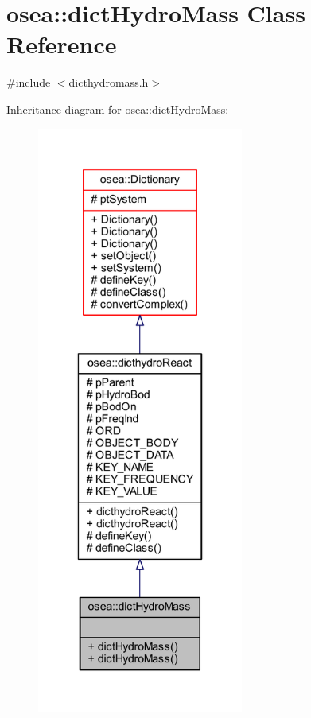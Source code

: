 \hypertarget{classosea_1_1dict_hydro_mass}{\section{osea\-:\-:dict\-Hydro\-Mass Class Reference}
\label{classosea_1_1dict_hydro_mass}
}


{\ttfamily \#include $<$dicthydromass.\-h$>$}



Inheritance diagram for osea\-:\-:dict\-Hydro\-Mass\-:
\nopagebreak
\begin{figure}[H]
\begin{center}
\leavevmode
\includegraphics[height=550pt]{classosea_1_1dict_hydro_mass__inherit__graph}
\end{center}
\end{figure}
